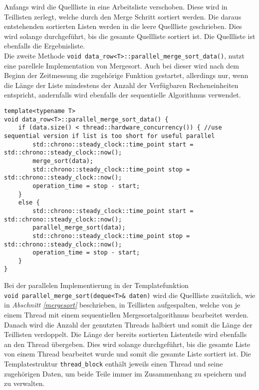 Anfangs wird die Quellliste in eine Arbeitsliste verschoben. Diese wird in Teillisten zerlegt, welche durch den Merge Schritt sortiert werden. Die daraus entstehenden sortierten Listen werden in die leere Quellliste geschrieben. Dies wird solange durchgeführt, bis die gesamte Quellliste sortiert ist. Die Quellliste ist ebenfalls die Ergebnisliste.\\[0.25 cm]
Die zweite Methode \texttt{void data\_row<T>::parallel\_merge\_sort\_data()}, nutzt eine parellele Implementation von Mergesort. Auch bei dieser wird nach dem Beginn der Zeitmessung die zugehörige Funktion gestartet, allerdings nur, wenn die Länge der Liste mindestens der Anzahl der Verfügbaren Recheneinheiten entspricht, andernfalls wird ebenfalls der sequentielle Algorithmus verwendet.
\begin{lstlisting}
template<typename T>
void data_row<T>::parallel_merge_sort_data() {
	if (data.size() < thread::hardware_concurrency()) { //use sequential version if list is too short for useful parallel
		std::chrono::steady_clock::time_point start = std::chrono::steady_clock::now();
		merge_sort(data);
		std::chrono::steady_clock::time_point stop = std::chrono::steady_clock::now();
		operation_time = stop - start;
	}
	else {
		std::chrono::steady_clock::time_point start = std::chrono::steady_clock::now();
		parallel_merge_sort(data);
		std::chrono::steady_clock::time_point stop = std::chrono::steady_clock::now();
		operation_time = stop - start;
	}
}
\end{lstlisting}
Bei der parallelen Implementierung in der Templatefunktion\\ \texttt{void parallel\_merge\_sort(deque<T>\& daten)} wird die Quellliste zusätzlich, wie in \textit{Abschnitt \ref{mergesort}} beschrieben, in Teillisten aufgespalten, welche von je einem Thread mit einem sequentiellen Mergesortalgorithmus bearbeitet werden. Danach wird die Anzahl der genutzten Threads halbiert und somit die Länge der Teillisten verdoppelt. Die Länge der bereits sortierten Listenteile wird ebenfalls an den Thread übergeben. Dies wird solange durchgeführt, bis die gesamte Liste von einem Thread bearbeitet wurde und somit die gesamte Liste sortiert ist. Die Templatestruktur \texttt{thread\_block} enthält jeweils einen Thread und seine zugehörigen Daten, um beide Teile immer im Zusammenhang zu speichern und zu verwalten.
